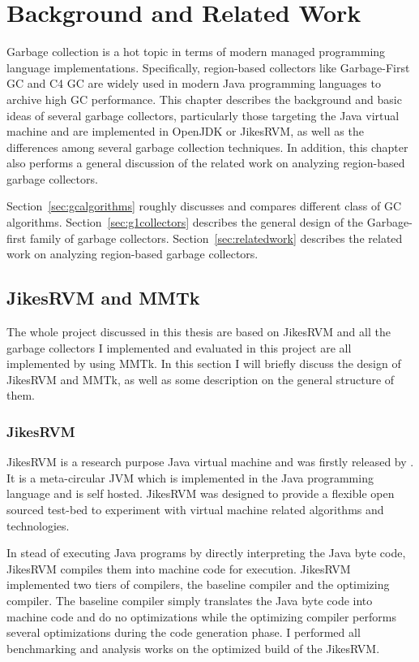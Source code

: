 \chapter{Background and Related Work}
\label{cha:background}

Garbage collection is a hot topic in terms of modern managed programming language
implementations. Specifically, region-based collectors like Garbage-First GC and
C4 GC are widely used in modern Java programming languages to archive high GC performance.
This chapter describes the background and basic ideas of several garbage collectors,
particularly those targeting the Java virtual machine and are implemented in OpenJDK or JikesRVM,
as well as the differences among several garbage collection techniques.
In addition, this chapter also performs a general discussion of the related work
on analyzing region-based garbage collectors.

Section~\ref{sec:gcalgorithms} roughly discusses and compares different class of GC algorithms.
Section~\ref{sec:g1collectors} describes the general design of the Garbage-first family of garbage collectors.
Section~\ref{sec:relatedwork} describes the related work on analyzing region-based garbage collectors.

\section{JikesRVM and MMTk}

The whole project discussed in this thesis are based on JikesRVM and all the garbage collectors
I implemented and evaluated in this project are all implemented by using MMTk.
In this section I will briefly discuss the design of JikesRVM and MMTk,
as well as some description on the general structure of them.

\subsection{JikesRVM}

JikesRVM is a research purpose Java virtual machine and was firstly released by \cite{alpern2005jikes}. It is a meta-circular JVM
which is implemented in the Java programming language and is self hosted.
JikesRVM was designed to provide a flexible open sourced test-bed to
experiment with virtual machine related algorithms and technologies.

In stead of executing Java programs by directly interpreting the Java byte code,
JikesRVM compiles them into machine code for execution.
JikesRVM implemented two tiers of compilers, the baseline compiler and the optimizing compiler.
The baseline compiler simply translates the Java byte code into machine code and do no
optimizations while the optimizing compiler performs several optimizations during the
code generation phase. I performed all benchmarking and analysis works on the
optimized build of the JikesRVM.

